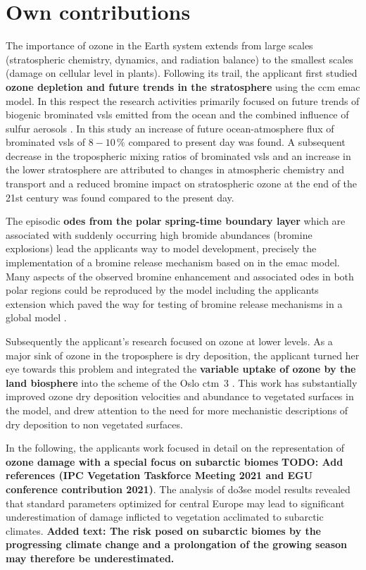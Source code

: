 \section{Own contributions}
\label{sec:contrib}
The importance of ozone in the Earth system extends from large scales (stratospheric chemistry, dynamics, and radiation balance) to the smallest scales (damage on cellular level in plants). Following its trail, the applicant first studied \textbf{ozone depletion and future trends in the stratosphere} using the \gls{ccm} \gls{emac} model. In this respect the research activities primarily focused on future trends of biogenic brominated \gls{vsls} emitted from the ocean and the combined influence of sulfur aerosols \parencite{ACP:Falk2017}. In this study an increase of future ocean-atmosphere flux of brominated \gls{vsls} of $8-10\,\%$ compared to present day was found. A subsequent decrease in the tropospheric mixing ratios of brominated \gls{vsls} and an increase in the lower stratosphere are attributed to changes in atmospheric chemistry and transport and a reduced bromine impact on stratospheric ozone at the end of the 21st century was found  compared to the present day.

The episodic \textbf{\glspl{ode} from the polar spring-time boundary layer} which are associated with suddenly occurring high bromide abundances (bromine explosions) lead the applicants way to model development, precisely the implementation of a bromine release mechanism based on \textcite{ACP:Toyota2011} in the \gls{emac} model. Many aspects of the observed bromine enhancement and associated \glspl{ode} in both polar regions could be reproduced by the model including the applicants extension which paved the way for testing of bromine release mechanisms in a global model \parencite{GMD:Falk2018}.

Subsequently the applicant’s research focused on ozone at lower levels. As a major sink of ozone in the troposphere is dry deposition, the applicant turned her eye towards this problem and integrated the \textbf{variable uptake of ozone by the land biosphere} into the scheme of the Oslo \gls{ctm}~3 \parencite{GMD:Falk2019}. This work has substantially improved ozone dry deposition velocities and abundance to vegetated surfaces in the model, and drew attention to the need for more mechanistic descriptions of dry deposition to non vegetated surfaces.

In the following, the applicants work focused in detail on the representation of \textbf{ozone damage with a special focus on subarctic biomes} \textbf{TODO: Add references (IPC Vegetation Taskforce Meeting 2021 and EGU conference contribution 2021)}. The analysis of \gls{do3se} model results revealed that standard parameters optimized for central Europe may lead to significant underestimation of damage inflicted to vegetation acclimated to subarctic climates. \textbf{Added text: The risk posed on subarctic biomes by the progressing climate change and a prolongation of the growing season may therefore be underestimated.}

